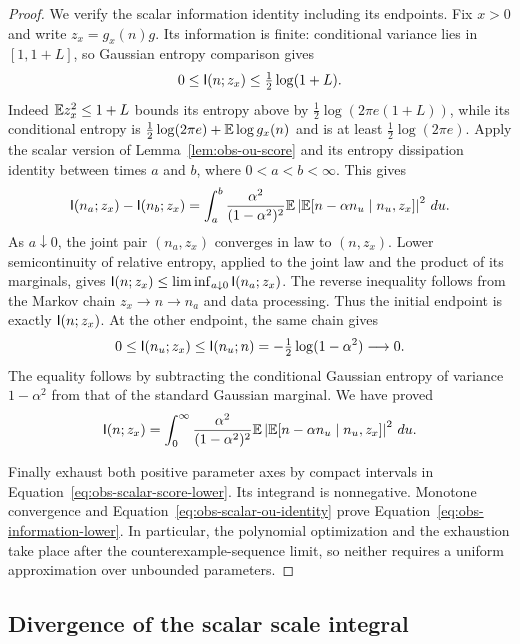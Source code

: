 \begin{proof}
We verify the scalar information identity including its endpoints.
Fix $x>0$ and write $z_x=g_x(n)g$.  Its information is finite:
conditional variance lies in $[1,1+L]$, so Gaussian entropy
comparison gives
\begin{equation}\label{eq:obs-scalar-information-finite}
 0\le\mathsf I(n;z_x)\le\tfrac12\log(1+L).
\end{equation}
Indeed $\mathbb E z_x^2\le1+L$ bounds its entropy above by
$\frac12\log(2\pi e(1+L))$, while its conditional entropy is
$\frac12\log(2\pi e)+\mathbb E\log g_x(n)$ and is at least
$\frac12\log(2\pi e)$.
Apply the scalar version of Lemma~\ref{lem:obs-ou-score} and its
entropy dissipation identity between times $a$ and $b$, where
$0<a<b<\infty$.  This gives
\begin{align*}
 \mathsf I(n_a;z_x)-\mathsf I(n_b;z_x)
 =\int_a^b\frac{\alpha^2}{(1-\alpha^2)^2}
 \mathbb E\left|\mathbb E[n-\alpha n_u\mid n_u,z_x]\right|^2\,du.
\end{align*}
As $a\downarrow0$, the joint pair $(n_a,z_x)$ converges in law
to $(n,z_x)$.  Lower semicontinuity of relative entropy, applied
to the joint law and the product of its marginals, gives
$\mathsf I(n;z_x)\le\liminf_{a\downarrow0}\mathsf I(n_a;z_x)$.
The reverse inequality follows from the Markov chain
$z_x\longrightarrow n\longrightarrow n_a$ and data processing.
Thus the initial endpoint is exactly $\mathsf I(n;z_x)$.
At the other endpoint, the same chain gives
\[
 0\le\mathsf I(n_u;z_x)\le\mathsf I(n_u;n)
       =-\tfrac12\log(1-\alpha^2)\longrightarrow0.
\]
The equality follows by subtracting the conditional Gaussian
entropy of variance $1-\alpha^2$ from that of the standard
Gaussian marginal.  We have proved
\begin{equation}\label{eq:obs-scalar-ou-identity}
 \mathsf I(n;z_x)=\int_0^\infty
 \frac{\alpha^2}{(1-\alpha^2)^2}
 \mathbb E\left|\mathbb E[n-\alpha n_u\mid n_u,z_x]\right|^2\,du.
\end{equation}

Finally exhaust both positive parameter axes by compact intervals
in Equation~\eqref{eq:obs-scalar-score-lower}.  Its integrand is
nonnegative.  Monotone convergence and
Equation~\eqref{eq:obs-scalar-ou-identity} prove
Equation~\eqref{eq:obs-information-lower}.  In particular, the
polynomial optimization and the exhaustion take place after the
counterexample-sequence limit, so neither requires a uniform
approximation over unbounded parameters.
\end{proof}

\subsection{Divergence of the scalar scale integral}

